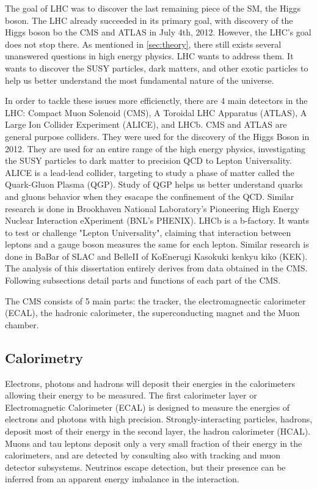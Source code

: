 The goal of LHC was to discover the last remaining piece of the SM, the Higgs boson.
The LHC already succeeded in its primary goal, with discovery of the Higgs boson bo the CMS and ATLAS in July 4th, 2012.
However, the LHC's goal does not stop there. 
As mentioned in \ref{sec:theory}, there still exists several unanswered questions in high energy physics.
LHC wants to address them. It wants to discover the SUSY particles, dark matters, and other exotic particles to help us better understand the most fundamental nature of the universe.

In order to tackle these issues more efficienctly, there are 4 main detectors in the LHC: Compact Muon Solenoid (CMS), A Toroidal LHC Apparatus (ATLAS), A Large Ion Collider Experiment (ALICE), and LHCb.
CMS and ATLAS are general purpose colliders. They were used for the discovery of the Higgs Boson in 2012. They are used for an entire range of the high energy physics, investigating the SUSY particles to dark matter to precision QCD to Lepton Universality.
ALICE is a lead-lead collider, targeting to study a phase of matter called the Quark-Gluon Plasma (QGP). Study of QGP helps us better understand quarks and gluons behavior when they esacape the confinement of the QCD.
Similar research is done in Brookhaven National Laboratory's Pioneering High Energy Nuclear Interaction eXperiment (BNL's PHENIX).
LHCb is a b-factory. It wants to test or challenge "Lepton Universality", claiming that interaction between leptons and a gauge boson measures the same for each lepton. 
Similar research is done in BaBar of SLAC and BelleII of KoEnerugi Kasokuki kenkyu kiko (KEK).
The analysis of this dissertation entirely derives from data obtained in the CMS.
Following subsections detail parts and functions of each part of the CMS.

The CMS consists of 5 main parts: the tracker, the electromagnectic calorimeter (ECAL), the hadronic calorimeter, the superconducting magnet and the Muon chamber.
\subsection{Calorimetry}
Electrons, photons and hadrons will deposit their energies in the calorimeters allowing their energy to be measured. 
The first calorimeter layer or Electromagnetic Calorimeter (ECAL) is designed to measure the energies of electrons and photons with high precision. 
Strongly-interacting particles, hadrons, deposit most of their energy in the second layer, the hadron calorimeter (HCAL). 
Muons and tau leptons deposit only a very small fraction of their energy in the calorimeters, and are detected by consulting also with tracking and muon detector subsystems. 
Neutrinos escape detection, but their presence can be inferred from an apparent energy imbalance in the interaction.

